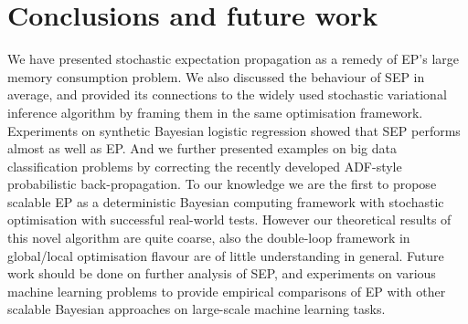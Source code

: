 \section{Conclusions and future work}
We have presented stochastic expectation propagation as a remedy of EP's large memory consumption problem. We also discussed the behaviour of SEP in average, and provided its connections to the widely used stochastic variational inference algorithm by framing them in the same optimisation framework. 
%
Experiments on synthetic Bayesian logistic regression showed that SEP performs almost as well as EP. And we further presented examples on big data classification problems by correcting the recently developed ADF-style probabilistic back-propagation. To our knowledge we are the first to propose scalable EP as a deterministic Bayesian computing framework with stochastic optimisation with successful real-world tests. However our theoretical results of this novel algorithm are quite coarse, also the double-loop framework in global/local optimisation flavour are of little understanding in general. Future work should be done on further analysis of SEP, and experiments on various machine learning problems to provide empirical comparisons of EP with other scalable Bayesian approaches on large-scale machine learning tasks.